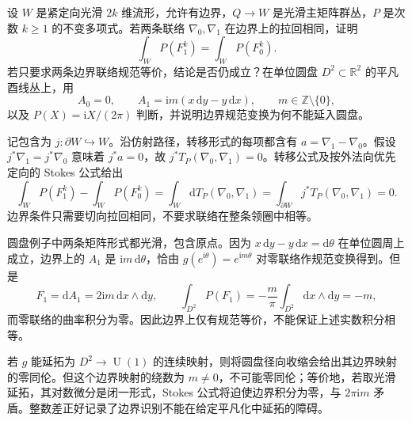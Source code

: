 \begin{exercise}\label{g2:ex:boundary-fixed-connection-period}
	设 \(W\) 是紧定向光滑 \(2k\) 维流形，允许有边界，\(Q\to W\) 是光滑主矩阵群丛，\(P\) 是次数 \(k\ge1\) 的不变多项式。若两条联络 \(\nabla_0,\nabla_1\) 在边界上的拉回相同，证明
	\[
		\int_W P(F_1^k)=\int_WP(F_0^k).
	\]
	若只要求两条边界联络规范等价，结论是否仍成立？在单位圆盘 \(D^2\subset\mathbb R^2\) 的平凡酉线丛上，用
	\[
		A_0=0,\qquad A_1=\mathrm i m(x\,\mathrm dy-y\,\mathrm dx),
		\qquad m\in\mathbb Z\setminus\{0\},
	\]
	以及 \(P(X)=\mathrm iX/(2\pi)\) 判断，并说明边界规范变换为何不能延入圆盘。
\end{exercise}
\begin{solution}
	记包含为 \(j:\partial W\hookrightarrow W\)。沿仿射路径，转移形式的每项都含有 \(a=\nabla_1-\nabla_0\)。假设 \(j^*\nabla_1=j^*\nabla_0\) 意味着 \(j^*a=0\)，故 \(j^*T_P(\nabla_0,\nabla_1)=0\)。转移公式及按外法向优先定向的 Stokes 公式给出
	\[
		\int_WP(F_1^k)-\int_WP(F_0^k)
		=\int_W\mathrm dT_P(\nabla_0,\nabla_1)
		=\int_{\partial W}j^*T_P(\nabla_0,\nabla_1)=0.
	\]
	边界条件只需要切向拉回相同，不要求联络在整条领圈中相等。

	圆盘例子中两条矩阵形式都光滑，包含原点。因为 \(x\,\mathrm dy-y\,\mathrm dx=\mathrm d\theta\) 在单位圆周上成立，边界上的 \(A_1\) 是 \(\mathrm i m\,\mathrm d\theta\)，恰由 \(g(e^{\mathrm i\theta})=e^{\mathrm i m\theta}\) 对零联络作规范变换得到。但是
	\[
		F_1=\mathrm dA_1=2\mathrm i m\,\mathrm dx\wedge\mathrm dy,
		\qquad
		\int_{D^2}P(F_1)
		=-\frac m\pi\int_{D^2}\mathrm dx\wedge\mathrm dy=-m,
	\]
	而零联络的曲率积分为零。因此边界上仅有规范等价，不能保证上述实数积分相等。

	若 \(g\) 能延拓为 \(D^2\to\operatorname U(1)\) 的连续映射，则将圆盘径向收缩会给出其边界映射的零同伦。但这个边界映射的绕数为 \(m\ne0\)，不可能零同伦；等价地，若取光滑延拓，其对数微分是闭一形式，Stokes 公式将迫使边界积分为零，与 \(2\pi\mathrm i m\) 矛盾。整数差正好记录了边界识别不能在给定平凡化中延拓的障碍。
\end{solution}

